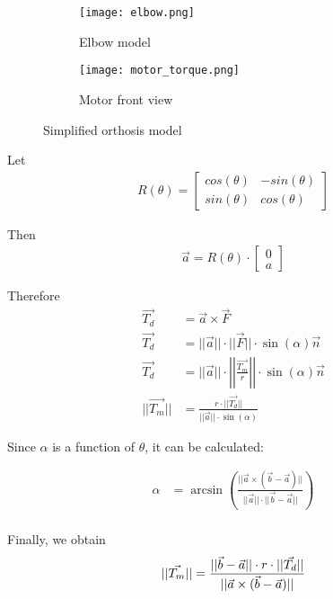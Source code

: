 \begin{figure}[htbp]
    \centering
    \begin{subfigure}{0.2\textwidth}
        \centering
        \texttt{[image: elbow.png]}
        \caption{Elbow model}
        \label{fig:elbow}
    \end{subfigure}
    \begin{subfigure}{0.3\textwidth}
        \centering
        \texttt{[image: motor\_torque.png]}
        \caption{Motor front view}
        \label{fig:motor}
    \end{subfigure}
    \caption{
      Simplified orthosis model
    }
    \label{fig:orthosis_model}
\end{figure}

Let  
\begin{align*}
  R(\theta)=\begin{bmatrix} cos(\theta) & -sin(\theta) \\ sin(\theta) & cos(\theta) \end{bmatrix}
\end{align*}  

Then  
\begin{align*}
  \vec{a}=R(\theta) \cdot \begin{bmatrix} 0 \\ a \end{bmatrix}
\end{align*}  

Therefore  
\begin{align*}
  \vec{T_d} &= \vec{a} \times \vec{F} \\  
  \vec{T_d} &= ||\vec{a}|| \cdot ||\vec{F}|| \cdot \sin(\alpha) \vec{n} \\  
  \vec{T_d} &= ||\vec{a}|| \cdot \left|\left| \frac{\vec{T_m}}{r} \right|\right| \cdot \sin(\alpha) \vec{n} \\  
  ||\vec{T_m}|| &= \frac{r \cdot ||\vec{T_d}||}{||\vec{a}|| \cdot \sin(\alpha)}  
\end{align*}  

Since $\alpha$ is a function of $\theta$, it can be calculated:   

\begin{align*}
  \alpha &= \arcsin(\frac{||\vec{a} \times (\vec{b}-\vec{a})||}{||\vec{a}|| \cdot ||\vec{b}-\vec{a}||}) \\  
\end{align*}  

Finally, we obtain
\begin{equation}
  \centering
  ||\vec{T_m}|| = \frac{||\vec{b}-\vec{a}|| \cdot r \cdot ||\vec{T_d}||}{||\vec{a} \times (\vec{b}-\vec{a})||}  
  \label{eq:inv_model}
\end{equation}  

